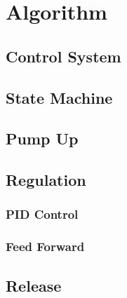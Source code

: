 \chapter{Algorithm}
\label{chap:9}

\section{Control System}
\section{State Machine}
\section{Pump Up}
\section{Regulation}
\subsection{PID Control}
\subsection{Feed Forward}
\section{Release}
